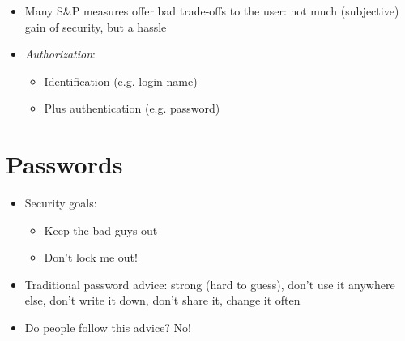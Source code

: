 \documentclass[a4paper]{scrartcl}
\begin{document}
\begin{itemize}
	\item
		Many S\&P measures offer bad trade-offs to the user: not much (subjective) gain of security, but a hassle
	\item
		\textit{Authorization}: 
		\begin{itemize}
			\item
				Identification (e.g. login name)
			\item
				Plus authentication (e.g. password)
		\end{itemize}
\end{itemize}



\section{Passwords}
\begin{itemize}
	\item
		Security goals:
		\begin{itemize}
			\item
				Keep the bad guys out
			\item
				Don't lock me out!
		\end{itemize}
	\item
		Traditional password advice: strong (hard to guess), don't use it anywhere else, don't write it down, don't share it, change it often
	\item
		Do people follow this advice? No!
\end{itemize}
\end{document}
